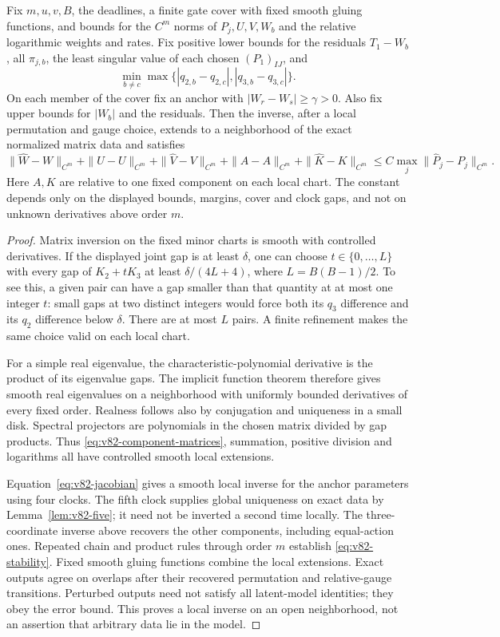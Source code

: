 \begin{proposition}\label{prop:v82-stable}
Fix $m,u,v,B$, the deadlines, a finite gate cover with fixed smooth
gluing functions, and bounds for the $C^m$ norms of $P_j,U,V,W_b$
and the relative logarithmic weights and rates. Fix positive lower
bounds for the residuals $T_1-W_b$, all $\pi_{j,b}$, the least
singular value of each chosen $(P_1)_{IJ}$, and
\[
 \min_{b\ne c}\max\{|q_{2,b}-q_{2,c}|,|q_{3,b}-q_{3,c}|\}.
\]
On each member of the cover fix an anchor with
$|W_r-W_s|\ge\gamma>0$. Also fix upper bounds for $|W_b|$ and the
residuals. Then the inverse, after a local permutation and gauge choice,
extends to a neighborhood of the exact normalized matrix data and
satisfies
\begin{equation}\label{eq:v82-stability}
 \|\widehat W-W\|_{C^m}+
 \|\widehat U-U\|_{C^m}+\|\widehat V-V\|_{C^m}
 +\|\widehat A-A\|_{C^m}+\|\widehat K-K\|_{C^m}
 \le C\max_j\|\widehat P_j-P_j\|_{C^m}.
\end{equation}
Here $A,K$ are relative to one fixed component on each local chart.
The constant depends only on the displayed bounds, margins, cover and
clock gaps, and not on unknown derivatives above order $m$.
\end{proposition}
\begin{proof}
Matrix inversion on the fixed minor charts is smooth with controlled
derivatives. If the displayed joint gap is at least $\delta$, one
can choose $t\in\{0,\ldots,L\}$ with every gap of $K_2+tK_3$
at least $\delta/(4L+4)$, where $L=B(B-1)/2$.
To see this, a given pair can have a gap smaller than that quantity at
at most one integer $t$: small gaps at two distinct integers would force
both its $q_3$ difference and its $q_2$ difference below $\delta$.
There are at most $L$ pairs. A finite refinement makes the same choice
valid on each local chart.

For a simple real eigenvalue, the characteristic-polynomial derivative
is the product of its eigenvalue gaps. The implicit function theorem
therefore gives smooth real eigenvalues on a neighborhood with uniformly
bounded derivatives of every fixed order. Realness follows also by
conjugation and uniqueness in a small disk. Spectral projectors are
polynomials in the chosen matrix divided by gap products. Thus
\eqref{eq:v82-component-matrices}, summation, positive division and
logarithms all have controlled smooth local extensions.

Equation~\eqref{eq:v82-jacobian} gives a smooth local inverse for the
anchor parameters using four clocks. The fifth clock supplies global
uniqueness on exact data by Lemma~\ref{lem:v82-five}; it need not be
inverted a second time locally. The three-coordinate inverse above
recovers the other components, including equal-action ones. Repeated
chain and product rules through order $m$ establish
\eqref{eq:v82-stability}. Fixed smooth gluing functions combine the
local extensions. Exact outputs agree on overlaps after their recovered
permutation and relative-gauge transitions. Perturbed outputs need not
satisfy all latent-model identities; they obey the error bound.
This proves a local inverse on an open neighborhood, not an assertion
that arbitrary data lie in the model.
\end{proof}

